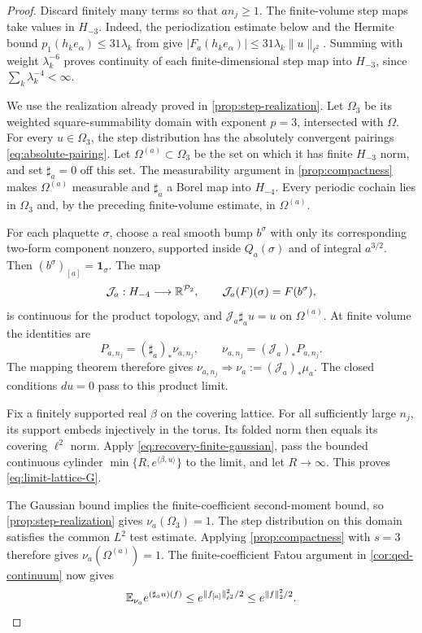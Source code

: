 \begin{proof}
Discard finitely many terms so that $an_j\ge1$.
The finite-volume step maps take values in $H_{-3}$.
Indeed, the periodization estimate below and the Hermite bound
$p_1(h_ke_\alpha)\le31\lambda_k$ from
\cite[Section~3]{QED3Integration} give
$|F_a(h_ke_\alpha)|\le31\lambda_k\|u\|_{\ell^2}$.
Summing with weight $\lambda_k^{-6}$ proves continuity of
each finite-dimensional step map into $H_{-3}$, since
$\sum_k\lambda_k^{-4}<\infty$.

We use the realization already proved in
\cref{prop:step-realization}. Let $\Omega_3$ be its weighted
square-summability domain with exponent $p=3$, intersected with
$\Omega$. For every $u\in\Omega_3$, the step distribution has the
absolutely convergent pairings \eqref{eq:absolute-pairing}.
Let $\Omega^{(a)}\subset\Omega_3$ be the set on which it has
finite $H_{-3}$ norm, and set $\sharp_a=0$ off this set.
The measurability argument in \cref{prop:compactness} makes
$\Omega^{(a)}$ measurable and $\sharp_a$ a Borel map into $H_{-4}$.
Every periodic cochain lies in $\Omega_3$ and, by the preceding
finite-volume estimate, in $\Omega^{(a)}$.

For each plaquette $\sigma$, choose a real smooth bump $b^\sigma$
with only its corresponding two-form component nonzero, supported
inside $Q_a(\sigma)$ and of integral $a^{3/2}$. Then
$(b^\sigma)_{[a]}=\mathbf1_\sigma$. The map
\begin{equation}\label{eq:limit-step-inverse}
 \mathcal J_a:H_{-4}\longrightarrow\mathbb R^{\mathcal P_2},
 \qquad \mathcal J_a(F)(\sigma)=F(b^\sigma),
\end{equation}
is continuous for the product topology, and
$\mathcal J_a\sharp_a u=u$ on $\Omega^{(a)}$.
At finite volume the identities are
\[
 P_{a,n_j}=(\sharp_a)_*\nu_{a,n_j},\qquad
 \nu_{a,n_j}=(\mathcal J_a)_*P_{a,n_j}.
\]
The mapping theorem therefore gives
$\nu_{a,n_j}\Longrightarrow\nu_a:=(\mathcal J_a)_*\mu_a$.
The closed conditions $du=0$ pass to this product limit.

Fix a finitely supported real $\beta$ on the covering lattice.
For all sufficiently large $n_j$, its support embeds injectively
in the torus. Its folded norm then equals its covering
$\ell^2$ norm. Apply \eqref{eq:recovery-finite-gaussian}, pass
the bounded continuous cylinder
$\min\{R,e^{\langle\beta,u\rangle}\}$ to the limit, and let
$R\to\infty$. This proves \eqref{eq:limit-lattice-G}.

The Gaussian bound implies the finite-coefficient second-moment
bound, so \cref{prop:step-realization} gives $\nu_a(\Omega_3)=1$.
The step distribution on this domain satisfies the common
$L^2$ test estimate. Applying \cref{prop:compactness} with $s=3$
therefore gives $\nu_a(\Omega^{(a)})=1$.
The finite-coefficient Fatou argument in
\cref{cor:qed-continuum} now gives
\[
 \mathbb E_{\nu_a}e^{(\sharp_a u)(f)}
 \le e^{\|f_{[a]}\|_{\ell^2}^2/2}
 \le e^{\|f\|_2^2/2}.
\]


\end{proof}
